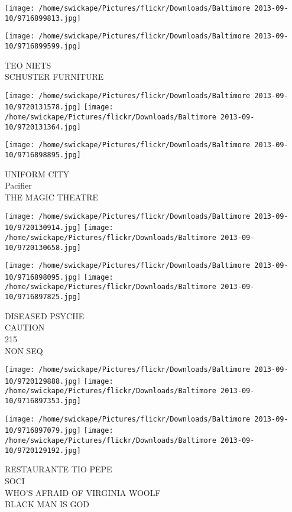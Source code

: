 \documentclass[10pt,letterpaper]{article}
\begin{document}
\texttt{[image: /home/swickape/Pictures/flickr/Downloads/Baltimore 2013-09-10/9716899813.jpg]}

\vspace{0.25in}
\texttt{[image: /home/swickape/Pictures/flickr/Downloads/Baltimore 2013-09-10/9716899599.jpg]}

TEO NIETS\\
SCHUSTER FURNITURE\\
\pagebreak

\texttt{[image: /home/swickape/Pictures/flickr/Downloads/Baltimore 2013-09-10/9720131578.jpg]}
\texttt{[image: /home/swickape/Pictures/flickr/Downloads/Baltimore 2013-09-10/9720131364.jpg]}

\vspace{0.25in}
\texttt{[image: /home/swickape/Pictures/flickr/Downloads/Baltimore 2013-09-10/9716898895.jpg]}

UNIFORM CITY\\
Pacifier\\
THE MAGIC THEATRE\\
\pagebreak

\texttt{[image: /home/swickape/Pictures/flickr/Downloads/Baltimore 2013-09-10/9720130914.jpg]}
\texttt{[image: /home/swickape/Pictures/flickr/Downloads/Baltimore 2013-09-10/9720130658.jpg]}

\texttt{[image: /home/swickape/Pictures/flickr/Downloads/Baltimore 2013-09-10/9716898095.jpg]}
\texttt{[image: /home/swickape/Pictures/flickr/Downloads/Baltimore 2013-09-10/9716897825.jpg]}

DISEASED PSYCHE\\
CAUTION\\
215\\
NON SEQ\\
\pagebreak

\texttt{[image: /home/swickape/Pictures/flickr/Downloads/Baltimore 2013-09-10/9720129888.jpg]}
\texttt{[image: /home/swickape/Pictures/flickr/Downloads/Baltimore 2013-09-10/9716897353.jpg]}

\texttt{[image: /home/swickape/Pictures/flickr/Downloads/Baltimore 2013-09-10/9716897079.jpg]}
\texttt{[image: /home/swickape/Pictures/flickr/Downloads/Baltimore 2013-09-10/9720129192.jpg]}

RESTAURANTE TIO PEPE\\
SOCI\\
WHO'S AFRAID OF VIRGINIA WOOLF\\
BLACK MAN IS GOD\\
\pagebreak
\end{document}

